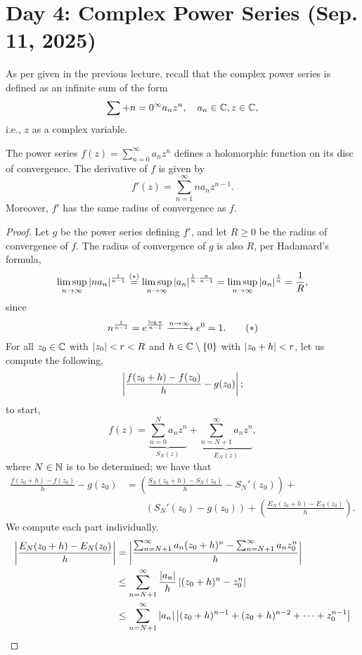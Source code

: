 \section{Day 4: Complex Power Series (Sep. 11, 2025)}
As per given in the previous lecture, recall that the complex power series is defined as an infinite sum of the form
\[ \sum+{n=0}^\infty a_n z^n, \quad a_n \in \mathbb C, z \in \mathbb C, \]
i.e., $z$ as a complex variable.
\begin{theorem}
    The power series $f(z) = \sum_{n=0}^\infty a_nz^n$ defines a holomorphic function on its disc of convergence. The derivative of $f$ is given by
    \[ f'(z) = \sum_{n=1}^\infty n a_n z^{n-1}. \]
    Moreover, $f'$ has the same radius of convergence as $f$.
\end{theorem}
\begin{proof}
    Let $g$ be the power series defining $f'$, and let $R \geq 0$ be the radius of convergence of $f$. The radius of convergence of $g$ is also $R$, per Hadamard's formula,
    \[ \limsup_{n \to \infty} \left\lvert n a_n \right\rvert^{\frac{1}{n-1}} \stackrel{(\ast)}{=} \limsup_{n \to \infty} \left\lvert a_n \right\rvert^{\frac{1}{n} \cdot \frac{n}{n-1}} = \limsup_{n \to \infty} \left\lvert a_n \right\rvert^{\frac{1}{n}} = \frac{1}{R}, \]
    since
    \[ n^{\frac{1}{n-1}} = e^{\frac{\log n}{n-1}} \xrightarrow{n \to \infty} e^0 = 1. \tag{$\ast$} \]
    For all $z_0 \in \mathbb C$ with $\left\lvert z_0 \right\rvert < r < R$ and $h \in \mathbb C \setminus \{0\}$ with $\left\lvert z_0 + h \right\rvert < r$, let us compute the following,
    \[ \left\lvert \frac{f(z_0 + h) - f(z_0)}{h} - g(z_0) \right\rvert; \]
    to start,
    \[ f(z) = \underbrace{\sum_{n=0}^N a_nz^n}_{S_N(z)} + \underbrace{\sum_{n=N+1}^\infty a_nz^n}_{E_N(z)}, \]
    where $N \in \mathbb N$ is to be determined; we have that
    \begin{align*}
        \frac{f(z_0 + h) - f(z_0)}{h} - g(z_0) &= \left(\frac{S_N(z_0 + h) - S_N(z_0)}{h} - S_N'(z_0)\right) + \\
        & \qquad \left(S_N'(z_0) - g(z_0)\right) + \left(\frac{E_N(z_0 + h) - E_N(z_0)}{h}\right).
    \end{align*}
    We compute each part individually.
    \begin{align*}
        \abs{\frac{E_N(z_0 + h) - E_N(z_0)}{h}} &= \abs{\frac{\sum_{n={N+1}}^\infty a_n(z_0 + h)^n - \sum_{n=N+1}^\infty a_n z_0^n}{h}} \\
        &\leq \sum_{n=N+1}^\infty \frac{\abs{a_n}}{h} \abs{(z_0 + h)^n - z_0^n} \\
        &\leq \sum_{n=N+1}^\infty \abs{a_n} \abs{(z_0 + h)^{n-1} + (z_0 + h)^{n-2} + \dots + z_0^{n-1}} \\

\end{align*}
\end{proof}
